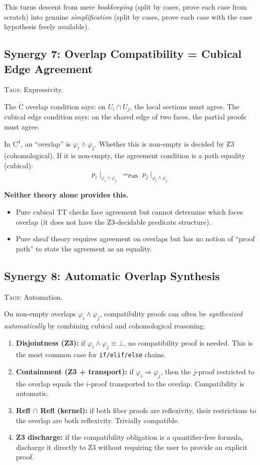 \documentclass[11pt,a4paper]{article}
\theoremstyle{definition}
\theoremstyle{plain}
\newcommand{\Path}{\mathsf{Path}}
\newcommand{\Cech}{\check{\mathrm{C}}}
\newcommand{\restr}[2]{#1\!\!\mid_{#2}}
\begin{document}
This turns descent from mere \emph{bookkeeping} (split by cases,
prove each case from scratch) into genuine \emph{simplification}
(split by cases, prove each case with the case hypothesis freely
available).


\subsection{Synergy 7: Overlap Compatibility = Cubical Edge Agreement}
\label{sec:syn-overlap-edge}

\textsc{Tags:} Expressivity.

\medskip\noindent
The $\Cech$ overlap condition says: on $U_i \cap U_j$, the local
sections must agree.  The cubical edge condition says: on the shared
edge of two faces, the partial proofs must agree.

In $\mathrm{C}^4$, an ``overlap'' is $\varphi_i \wedge \varphi_j$.
Whether this is non-empty is decided by Z3 (cohomological).  If it
is non-empty, the agreement condition is a path equality
(cubical):
\[
  \restr{p_i}{\varphi_i \wedge \varphi_j}
  \;=_{\Path}\;
  \restr{p_j}{\varphi_i \wedge \varphi_j}
\]

\textbf{Neither theory alone provides this.}
\begin{itemize}
\item Pure cubical TT checks face agreement but cannot determine
  which faces overlap (it does not have the Z3-decidable
  predicate structure).
\item Pure sheaf theory requires agreement on overlaps but has no
  notion of ``proof path'' to state the agreement as an equality.
\end{itemize}


\subsection{Synergy 8: Automatic Overlap Synthesis}
\label{sec:syn-auto-overlap}

\textsc{Tags:} Automation.

\medskip\noindent
On non-empty overlaps $\varphi_i \wedge \varphi_j$, compatibility
proofs can often be \emph{synthesized automatically} by combining
cubical and cohomological reasoning:

\begin{enumerate}
\item \textbf{Disjointness (Z3):} if $\varphi_i \wedge \varphi_j
  \equiv \bot$, no compatibility proof is needed.  This is the most
  common case for \texttt{if/elif/else} chains.
\item \textbf{Containment (Z3 + transport):} if $\varphi_i \Rightarrow
  \varphi_j$, then the $j$-proof restricted to the overlap equals
  the $i$-proof transported to the overlap.  Compatibility is
  automatic.
\item \textbf{Refl $\cap$ Refl (kernel):} if both fiber proofs
  are reflexivity, their restrictions to the overlap are both
  reflexivity.  Trivially compatible.
\item \textbf{Z3 discharge:} if the compatibility obligation is a
  quantifier-free formula, discharge it directly to Z3 without
  requiring the user to provide an explicit proof.
\end{enumerate}
\end{document}
